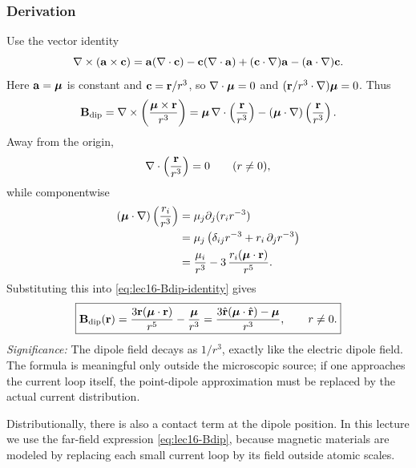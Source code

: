 \subsubsection*{Derivation}
Use the vector identity
\begin{equation}\label{eq:lec16-curl-cross-identity}
  \nabla\times(\mathbf{a}\times\mathbf{c})
  =
  \mathbf{a}(\nabla\cdot\mathbf{c})
  -\mathbf{c}(\nabla\cdot\mathbf{a})
  +(\mathbf{c}\cdot\nabla)\mathbf{a}
  -(\mathbf{a}\cdot\nabla)\mathbf{c}.
\end{equation}
Here $\mathbf{a}=\boldsymbol{\mu}$ is constant and $\mathbf{c}=\mathbf{r}/r^3$, so
$\nabla\cdot\boldsymbol{\mu}=0$ and $(\mathbf{r}/r^3\cdot\nabla)\boldsymbol{\mu}=0$.  Thus
\begin{equation}\label{eq:lec16-Bdip-identity}
  \mathbf{B}_{\rm dip}
  =\nabla\times\left(\frac{\boldsymbol{\mu}\times\mathbf{r}}{r^3}\right)
  =
  \boldsymbol{\mu}\,\nabla\cdot\left(\frac{\mathbf{r}}{r^3}\right)
  -(\boldsymbol{\mu}\cdot\nabla)\left(\frac{\mathbf{r}}{r^3}\right).
\end{equation}
Away from the origin,
\begin{equation}\label{eq:lec16-div-r-over-r3}
  \nabla\cdot\left(\frac{\mathbf{r}}{r^3}\right)=0
  \qquad (r\neq 0),
\end{equation}
while componentwise
\begin{align}
  (\boldsymbol{\mu}\cdot\nabla)\left(\frac{r_i}{r^3}\right)
  &= \mu_j\partial_j(r_i r^{-3}) \notag\\
  &= \mu_j\left(\delta_{ij}r^{-3}+r_i\,\partial_j r^{-3}\right) \notag\\
  &= \frac{\mu_i}{r^3}-3\,\frac{r_i(\boldsymbol{\mu}\cdot\mathbf{r})}{r^5}. \label{eq:lec16-directional-derivative}
\end{align}
Substituting this into \eqref{eq:lec16-Bdip-identity} gives
\begin{equation}\label{eq:lec16-Bdip}
  \boxed{
    \mathbf{B}_{\rm dip}(\mathbf{r})
    =
    \frac{3\mathbf{r}(\boldsymbol{\mu}\cdot\mathbf{r})}{r^5}
    -\frac{\boldsymbol{\mu}}{r^3}
    =
    \frac{3\hat{\mathbf{r}}(\boldsymbol{\mu}\cdot\hat{\mathbf{r}})-\boldsymbol{\mu}}{r^3},
    \qquad r\neq 0.
  }
\end{equation}
\textit{Significance:} The dipole field decays as $1/r^3$, exactly like the electric
dipole field.  The formula is meaningful only outside the microscopic source; if one
approaches the current loop itself, the point-dipole approximation must be replaced by
the actual current distribution.

\begin{remark}
  Distributionally, there is also a contact term at the dipole position.  In this
  lecture we use the far-field expression \eqref{eq:lec16-Bdip}, because magnetic
  materials are modeled by replacing each small current loop by its field outside
  atomic scales.
\end{remark}

